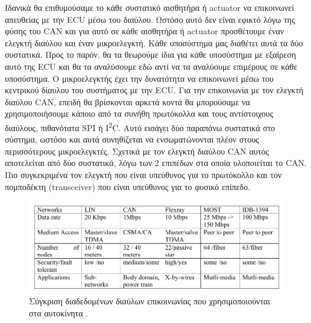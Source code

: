 \documentclass{article}
\begin{document}
Ιδανικά θα επιθυμούσαμε το κάθε συστατικό αισθητήρα ή actuator να επικοινωνεί απευθείας με την ECU μέσω του διαύλου. Ωστόσο αυτό δεν είναι εφικτό λόγω της φύσης του CAN και για αυτό σε κάθε αισθητήρα ή actuator προσθέτουμε έναν ελεγκτή διαύλου και έναν μικροελεγκτή. Κάθε υποσύστημα μας διαθέτει αυτά τα δύο συστατικά. Προς το παρόν, θα τα θεωρούμε ίδια για κάθε υποσύστημα με εξαίρεση αυτό της ECU και θα τα αναλύσουμε εδώ αντί να τα αναλύουμε επιμέρους σε κάθε υποσύστημα. O μικροελεγκτής έχει την δυνατότητα να επικοινωνεί μέσω του κεντρικού δίαυλου του συστήματος με την ECU. Για την επικοινωνία με τον ελεγκτή διαύλου CAN, επειδή θα βρίσκονται αρκετά κοντά θα μπορούσαμε να χρησιμοποιήσουμε κάποιο από τα συνήθη πρωτόκολλα και τους αντίστοιχους διαύλους, πιθανότατα SPI ή I\textsuperscript{2}C. Αυτό εισάγει δύο παραπάνω συστατικά στο σύστημα, ωστόσο και αυτά συνηθίζεται να ενσωματώνονται πλέον στους περισσότερους μικροελεγκτές. Σχετικά με τον ελεγκτή διαύλου CAN αυτός αποτελείται από δύο συστατικά, λόγω των 2 επιπέδων στα οποία υλοποιείται το CAN. Πιο συγκεκριμένα τον ελεγκτή που είναι υπεύθυνος για το πρωτόκολλο και τον πομποδέκτη (transceiver) που είναι υπεύθυνος για το φυσικό επίπεδο.

\begin{figure}[H]
    \begin{center}
    \includegraphics[scale=0.44]{images/vehicle-buses-overview.png}
    \end{center}
    \caption{Σύγκριση διαδεδομένων διαύλων επικοινωνίας που χρησιμοποιούνται στα αυτοκίνητα \cite{Nouvel2009AutomotiveNA}.}
    \label{fig:vehicle-buses-overview}
\end{figure}
\end{document}
